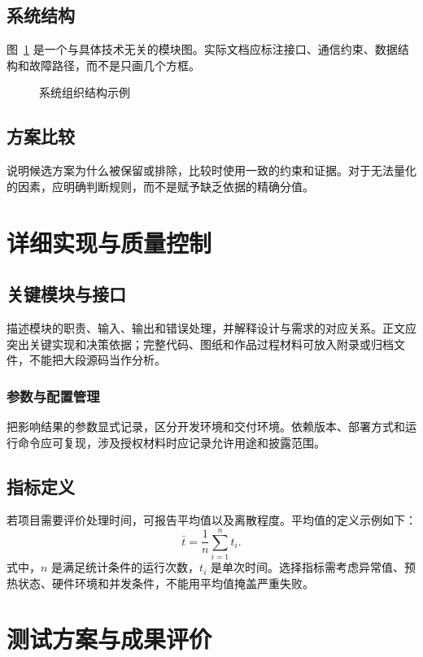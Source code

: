 \subsection{系统结构}
图~\ref{fig:architecture} 是一个与具体技术无关的模块图。实际文档应标注接口、通信约束、数据结构和故障路径，而不是只画几个方框。
\begin{figure}[htbp]\centering
{}\caption{系统组织结构示例}\label{fig:architecture}
\end{figure}
\subsection{方案比较}
说明候选方案为什么被保留或排除，比较时使用一致的约束和证据。对于无法量化的因素，应明确判断规则，而不是赋予缺乏依据的精确分值。
\clearpage\section{详细实现与质量控制}
\subsection{关键模块与接口}
描述模块的职责、输入、输出和错误处理，并解释设计与需求的对应关系。正文应突出关键实现和决策依据；完整代码、图纸和作品过程材料可放入附录或归档文件，不能把大段源码当作分析。
\subsubsection{参数与配置管理}
把影响结果的参数显式记录，区分开发环境和交付环境。依赖版本、部署方式和运行命令应可复现，涉及授权材料时应记录允许用途和披露范围。
\subsection{指标定义}
若项目需要评价处理时间，可报告平均值以及离散程度。平均值的定义示例如下：
\begin{equation}\bar{t}=\frac{1}{n}\sum_{i=1}^{n}t_i.\end{equation}
式中，$n$ 是满足统计条件的运行次数，$t_i$ 是单次时间。选择指标需考虑异常值、预热状态、硬件环境和并发条件，不能用平均值掩盖严重失败。
\clearpage\section{测试方案与成果评价}
